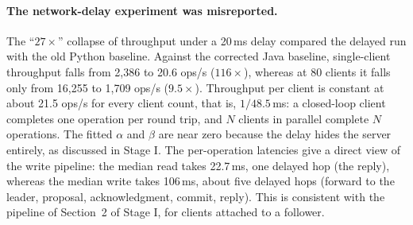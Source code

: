 \paragraph{The network-delay experiment was misreported.}
The ``$27\times$'' collapse of throughput under a 20\,ms delay compared the delayed run with the old Python
baseline. Against the corrected Java baseline, single-client throughput falls from 2{,}386 to 20.6 ops/s
($116\times$), whereas at 80 clients it falls only from 16{,}255 to 1{,}709 ops/s ($9.5\times$). Throughput per
client is constant at about 21.5 ops/s for every client count, that is, $1/48.5$\,ms: a closed-loop client completes one
operation per round trip, and $N$ clients in parallel complete $N$ operations. The fitted $\alpha$ and $\beta$ are
near zero because the delay hides the server entirely, as discussed in Stage I. The per-operation latencies give a
direct view of the write pipeline: the median read takes 22.7\,ms, one delayed hop (the reply), whereas the
median write takes 106\,ms, about five delayed hops (forward to the leader, proposal, acknowledgment, commit,
reply). This is consistent with the pipeline of Section~2 of Stage I, for clients attached to a follower.
